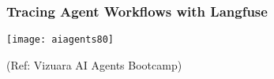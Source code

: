 \begin{frame}[fragile]\frametitle{Tracing Agent Workflows with Langfuse}

        \begin{center}

        \texttt{[image: aiagents80]}
		
		{\tiny (Ref: Vizuara AI Agents Bootcamp)}
				
        \end{center}    

\end{frame}
